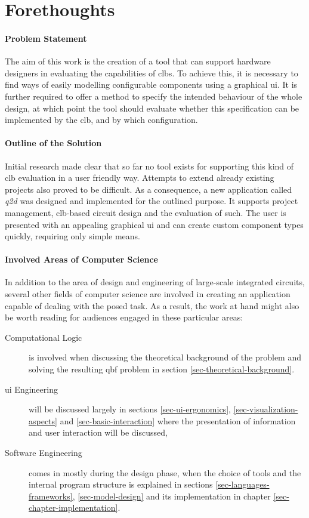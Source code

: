 \section{Forethoughts}

	\paragraph{Problem Statement}
	The aim of this work is the creation of a tool that can support hardware designers in evaluating the capabilities of \glspl{clb}.
	To achieve this, it is necessary to find ways of easily modelling configurable components using a graphical \gls{ui}.
	It is further required to offer a method to specify the intended behaviour of the whole design, at which point the tool should evaluate whether this specification can be implemented by the \gls{clb}, and by which configuration.
	

	\paragraph{Outline of the Solution}
	Initial research made clear that so far no tool exists for supporting this kind of \gls{clb} evaluation in a user friendly way.
	Attempts to extend already existing projects also proved to be difficult.
	As a consequence, a new application called \emph{q2d} was designed and implemented for the outlined purpose.
	It supports project management, \gls{clb}-based circuit design and the evaluation of such.
	The user is presented with an appealing graphical \gls{ui} and can create custom component types quickly, requiring only simple means.
	
	\paragraph{Involved Areas of Computer Science}
	In addition to the area of design and engineering of large-scale integrated circuits, several other fields of computer science are involved in creating an application capable of dealing with the posed task.
	As a result, the work at hand might also be worth reading for audiences engaged in these particular areas:
	
	\begin{description}
		\item[Computational Logic] is involved when discussing the theoretical background of the problem and solving the resulting \gls{qbf} problem in section \ref{sec-theoretical-background}.
		\item[\Gls{ui} Engineering] will be discussed largely in sections \ref{sec-ui-ergonomics}, \ref{sec-visualization-aspects} and \ref{sec-basic-interaction} where the presentation of information and user interaction will be discussed,
		\item[Software Engineering] comes in mostly during the design phase, when the choice of tools and the internal program structure is explained in sections \ref{sec-languages-frameworks}, \ref{sec-model-design} and its implementation in chapter \ref{sec-chapter-implementation}. 
	\end{description}

